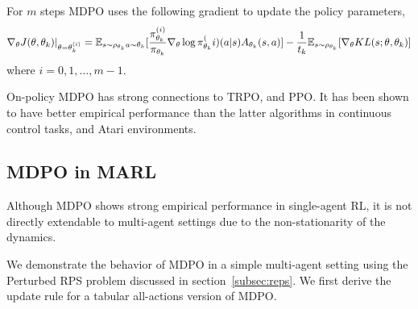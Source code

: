 For $m$ steps MDPO uses the following gradient to update the policy parameters, 
\begin{equation}
	\label{eqn:mdpograd}
	\nabla_{\theta} J(\theta, \theta_k)|_{\theta = \theta_k^{(i)}} = \mathbb{E}_{s \sim \rho_{\theta_k} \\ a \sim \theta_k} 
	[\frac{\pi_{\theta_k}^{(i)}}{\pi_{\theta_k}} \nabla_{\theta} \log \pi_{\theta_k}^(i) (a|s) A_{\theta_k}(s,a)] - 
	\frac{1}{t_k} \mathbb{E}_{s \sim \rho_{\theta_k}} [\nabla_\theta KL(s; \theta, \theta_k)]
\end{equation}
where $i=0,1,\ldots,m-1$.







On-policy MDPO has strong connections to TRPO, and PPO. It has been shown to have better empirical performance 
than the latter algorithms in continuous control tasks, and Atari environments.~\cite{tomarMirror2022}

\subsection{MDPO in MARL}
Although MDPO shows strong empirical performance in single-agent RL, it is not directly extendable to multi-agent settings 
due to the non-stationarity of the dynamics.

We demonstrate the behavior of MDPO in a simple multi-agent setting using the Perturbed RPS problem 
discussed in section~\ref{subsec:reps}.
We first derive the update rule for a tabular all-actions version of MDPO.

